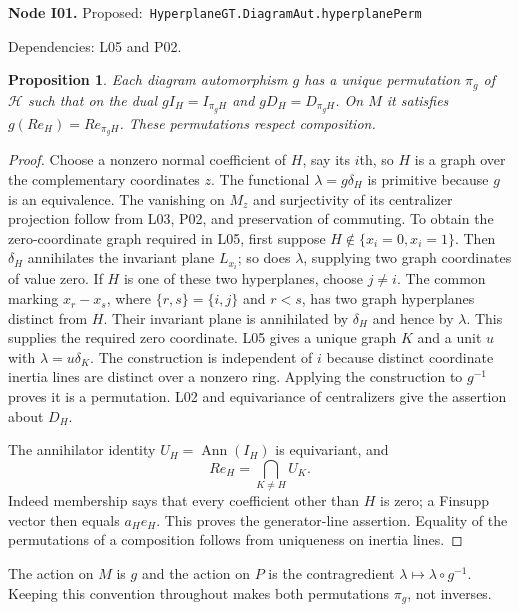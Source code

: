 \documentclass[11pt]{article}
\newtheorem{proposition}[theorem]{Proposition}
\theoremstyle{remark}\newtheorem{remark}[theorem]{Remark}
\newcommand{\cH}{\mathcal H}
\newcommand{\Ann}{\operatorname{Ann}}
\newcommand{\code}[1]{\nolinkurl{#1}}
\newcommand{\node}[3]{\par\Needspace{8\baselineskip}\smallskip\noindent\textbf{Node #1.}\quad
 \textsf{Proposed:}\ \code{#2}\par\noindent
 \textsf{Dependencies:} #3.\par\smallskip}
\begin{document}
\node{I01}{HyperplaneGT.DiagramAut.hyperplanePerm}{L05 and P02}
\begin{proposition}\label{prop:i01}
Each diagram automorphism $g$ has a unique permutation $\pi_g$ of
$\cH$ such that on the dual $gI_H=I_{\pi_gH}$ and
$gD_H=D_{\pi_gH}$. On $M$ it satisfies
$g(Re_H)=Re_{\pi_gH}$. These permutations respect composition.
\end{proposition}
\begin{proof}
Choose a nonzero normal coefficient of $H$, say its $i$th, so $H$
is a graph over the complementary coordinates $z$. The functional
$\lambda=g\delta_H$ is primitive because $g$ is an equivalence.
The vanishing on $M_z$ and surjectivity of its centralizer
projection follow from L03, P02, and preservation of commuting.
To obtain the zero-coordinate graph required in L05, first suppose
$H\notin\{x_i=0,x_i=1\}$. Then $\delta_H$ annihilates the
invariant plane $L_{x_i}$; so does $\lambda$, supplying two graph
coordinates of value zero. If $H$ is one of these two hyperplanes,
choose $j\ne i$. The common marking $x_r-x_s$, where
$\{r,s\}=\{i,j\}$ and $r<s$, has two graph hyperplanes distinct
from $H$. Their invariant plane is annihilated by $\delta_H$
and hence by $\lambda$. This supplies the required zero coordinate.
L05 gives a unique graph $K$ and a unit $u$ with
$\lambda=u\delta_K$. The construction is independent of $i$
because distinct coordinate inertia lines are distinct over a
nonzero ring. Applying the construction to $g^{-1}$ proves it is
a permutation. L02 and equivariance of centralizers give the
assertion about $D_H$.

The annihilator identity $U_H=\Ann(I_H)$ is equivariant, and
\[
 Re_H=\bigcap_{K\ne H}U_K.
\]
Indeed membership says that every coefficient other than $H$ is
zero; a Finsupp vector then equals $a_He_H$. This proves the
generator-line assertion. Equality of the permutations of a
composition follows from uniqueness on inertia lines.
\end{proof}
The action on $M$ is $g$ and the action on $P$ is the
contragredient $\lambda\mapsto\lambda\circ g^{-1}$. Keeping this
convention throughout makes both permutations $\pi_g$, not inverses.
\end{document}
